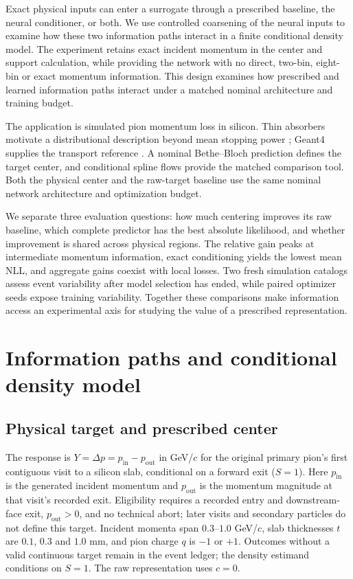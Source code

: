 \documentclass[11pt]{article}
\newcommand{\pin}{p_{\mathrm{in}}}
\newcommand{\pout}{p_{\mathrm{out}}}
\begin{document}
Exact physical inputs can enter a surrogate through a prescribed baseline,
the neural conditioner, or both. We use controlled coarsening of the neural
inputs to examine how these two information paths interact in a finite
conditional density model. The experiment retains exact incident momentum in
the center and support calculation, while providing the network with no direct,
two-bin, eight-bin or exact momentum information. This design examines how
prescribed and learned information paths interact under a matched nominal
architecture and training budget.

The application is simulated pion momentum loss in silicon. Thin absorbers
motivate a distributional description beyond mean stopping power
\citep{Bichsel1988,PDG2025}; Geant4 supplies the transport reference
\citep{Agostinelli2003,Allison2006}. A nominal Bethe--Bloch prediction defines
the target center, and conditional spline flows provide the matched
comparison tool. Both the physical center and the raw-target baseline use
the same nominal network architecture and optimization budget.

We separate three evaluation questions: how much centering improves its raw
baseline, which complete predictor has the best absolute likelihood, and
whether improvement is shared across physical regions. The relative gain
peaks at intermediate momentum information, exact conditioning yields the
lowest mean NLL, and aggregate gains coexist with local losses.
Two fresh simulation catalogs assess event variability after model selection
has ended, while paired optimizer seeds expose training variability. Together
these comparisons make information access an experimental axis for studying
the value of a prescribed representation.



\section{Information paths and conditional density model}
\label{sec:model}

\subsection{Physical target and prescribed center}

The response is $Y=\Delta p=\pin-\pout$ in GeV/$c$ for the original
primary pion's first contiguous visit to a silicon slab, conditional on a
forward exit ($S=1$). Here $\pin$ is the generated incident momentum and
$\pout$ is the momentum magnitude at that visit's recorded exit. Eligibility
requires a recorded entry and downstream-face exit, $\pout>0$, and no
technical abort; later visits and secondary particles do not define this
target. Incident momenta span $0.3$--$1.0$ GeV/$c$, slab thicknesses $t$ are
$0.1$, $0.3$ and $1.0$ mm, and pion charge $q$ is $-1$ or $+1$.
Outcomes without a valid continuous target remain in the event ledger;
the density estimand conditions on $S=1$. The raw representation uses $c=0$.
\end{document}
